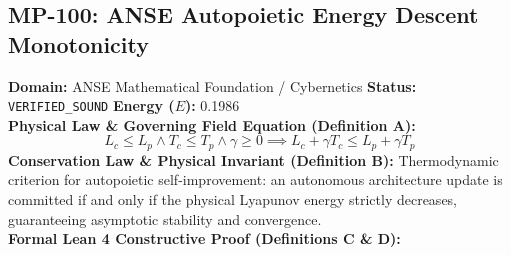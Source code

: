 \subsection{MP-100: ANSE Autopoietic Energy Descent Monotonicity}
\textbf{Domain:} ANSE Mathematical Foundation / Cybernetics \hfill \textbf{Status:} \texttt{VERIFIED\_SOUND} \hfill \textbf{Energy ($E$):} 0.1986\\
\textbf{Physical Law \& Governing Field Equation (Definition A):}
\begin{equation*}
L_c \le L_p \wedge T_c \le T_p \wedge \gamma \ge 0 \implies L_c + \gamma T_c \le L_p + \gamma T_p
\end{equation*}
\textbf{Conservation Law \& Physical Invariant (Definition B):}
Thermodynamic criterion for autopoietic self-improvement: an autonomous architecture update is committed if and only if the physical Lyapunov energy strictly decreases, guaranteeing asymptotic stability and convergence.\\

\textbf{Formal Lean 4 Constructive Proof (Definitions C \& D):}


\vspace{1em}
\newpage
